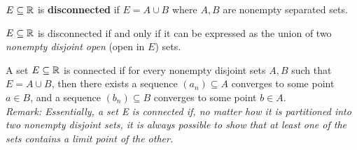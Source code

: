\documentclass[11pt]{article}
\begin{document}
	\begin{definition}
		$E \subseteq \mathbb{R}$ is \textbf{disconnected} if $E = A \cup B$ where $A, B$ are nonempty separated sets.
	\end{definition}
	
	\begin{proposition}
		$E \subseteq \mathbb{R}$ is disconnected if and only if it can be expressed as the union of two \emph{nonempty disjoint open} (open in $E$) sets.
	\end{proposition}
	
	
	\begin{theorem}
		A set $E \subseteq \mathbb{R}$ is connected if for every nonempty disjoint sets $A, B$ such that $E = A \cup B$, then there exists a sequence $(a_n) \subseteq A$ converges to some point $a \in B$, and a sequence $(b_n) \subseteq B$ converges to some point $b \in A$. \\
		\emph{Remark: Essentially, a set E is connected if, no matter how it is partitioned into two nonempty disjoint sets, it is always possible to show that at least one of the sets contains a limit point of the other.}
	\end{theorem}
	
\end{document}
